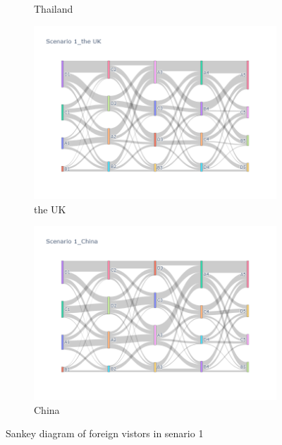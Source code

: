 \begin{figure}[h]
\begin{subfigure}{0.5\textwidth}
    \caption{Thailand}
  \end{subfigure}
  \begin{subfigure}{0.5\textwidth}
    \centering
    \includegraphics[width=\linewidth]{Figure/figure35a.png}
    \caption{the UK}
  \end{subfigure}
  \begin{subfigure}{0.5\textwidth}
    \centering
    \includegraphics[width=\linewidth]{Figure/figure36a.png}
    \caption{China}
  \end{subfigure}
  \caption{ Sankey diagram of foreign vistors in senario 1 }
  \label{fig32}
\end{figure}

